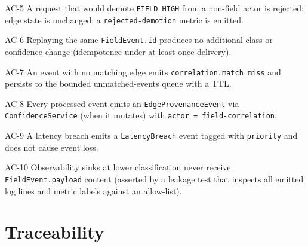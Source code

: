 \begin{ac}{AC-5}
A request that would demote \texttt{FIELD\_HIGH} from a non-field actor is rejected; edge state is unchanged; a \texttt{rejected-demotion} metric is emitted.
\end{ac}

\begin{ac}{AC-6}
Replaying the same \texttt{FieldEvent.id} produces no additional class or confidence change (idempotence under at-least-once delivery).
\end{ac}

\begin{ac}{AC-7}
An event with no matching edge emits \texttt{correlation.match\_miss} and persists to the bounded unmatched-events queue with a TTL.
\end{ac}

\begin{ac}{AC-8}
Every processed event emits an \texttt{EdgeProvenanceEvent} via \texttt{ConfidenceService} (when it mutates) with \texttt{actor = field-correlation}.
\end{ac}

\begin{ac}{AC-9}
A latency breach emits a \texttt{LatencyBreach} event tagged with \texttt{priority} and does not cause event loss.
\end{ac}

\begin{ac}{AC-10}
Observability sinks at lower classification never receive \texttt{FieldEvent.payload} content (asserted by a leakage test that inspects all emitted log lines and metric labels against an allow-list).
\end{ac}

\section{Traceability}

